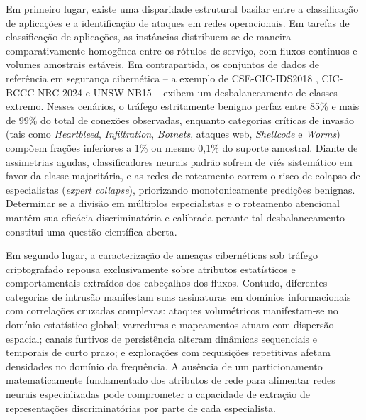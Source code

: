 Em primeiro lugar, existe uma disparidade estrutural basilar entre a classificação de aplicações e a identificação de ataques em redes operacionais. Em tarefas de classificação de aplicações, as instâncias distribuem-se de maneira comparativamente homogênea entre os rótulos de serviço, com fluxos contínuos e volumes amostrais estáveis. Em contrapartida, os conjuntos de dados de referência em segurança cibernética -- a exemplo de CSE-CIC-IDS2018 \cite{Sharafaldin2018TowardGA}, CIC-BCCC-NRC-2024 e UNSW-NB15 \cite{standard2021} -- exibem um desbalanceamento de classes extremo. Nesses cenários, o tráfego estritamente benigno perfaz entre 85\% e mais de 99\% do total de conexões observadas, enquanto categorias críticas de invasão (tais como \emph{Heartbleed}, \emph{Infiltration}, \emph{Botnets}, ataques web, \emph{Shellcode} e \emph{Worms}) compõem frações inferiores a 1\% ou mesmo 0,1\% do suporte amostral. Diante de assimetrias agudas, classificadores neurais padrão sofrem de viés sistemático em favor da classe majoritária, e as redes de roteamento correm o risco de colapso de especialistas (\emph{expert collapse}), priorizando monotonicamente predições benignas. Determinar se a divisão em múltiplos especialistas e o roteamento atencional mantêm sua eficácia discriminatória e calibrada perante tal desbalanceamento constitui uma questão científica aberta.

Em segundo lugar, a caracterização de ameaças cibernéticas sob tráfego criptografado repousa exclusivamente sobre atributos estatísticos e comportamentais extraídos dos cabeçalhos dos fluxos. Contudo, diferentes categorias de intrusão manifestam suas assinaturas em domínios informacionais com correlações cruzadas complexas: ataques volumétricos manifestam-se no domínio estatístico global; varreduras e mapeamentos atuam com dispersão espacial; canais furtivos de persistência alteram dinâmicas sequenciais e temporais de curto prazo; e explorações com requisições repetitivas afetam densidades no domínio da frequência. A ausência de um particionamento matematicamente fundamentado dos atributos de rede para alimentar redes neurais especializadas pode comprometer a capacidade de extração de representações discriminatórias por parte de cada especialista.

